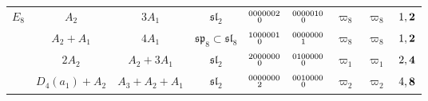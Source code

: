 \documentclass{amsart}
\theoremstyle{definition}
\newcommand{\0}{\mathcal{O}}
\begin{document}
\begin{table}[htp]
\begin{center}
\begin{tabular}{|c | c| c| c| c| c| c|c | c|}
				$E_8$ 
				& $A_2$ & $3A_1$ & $\mathfrak{sl}_2$ & $\scriptsize{\begin{aligned} 00 &00002 \\[-1.8mm] &0\end{aligned}}$ & $\scriptsize{\begin{aligned}00 &00010 \\[-1.8mm] &0\end{aligned}}$ 
                 & $\varpi_8$ & $\varpi_8$ 
                 & $1,{\bf 2}$\\

                & $A_2+A_1$ & $4A_1$ & $\mathfrak{sp}_8\subset \mathfrak{sl}_8$ & $\scriptsize{\begin{aligned}10 &00001 \\[-1.8mm] &0\end{aligned}}$ & $\scriptsize{\begin{aligned}00 &00000 \\[-1.8mm] &1\end{aligned}}$ 
                & $\varpi_8$ & $\varpi_8$ 
                & $\tiny{1, {\bf 2}}$ \\
                    
				& $2A_2$ & $A_2+3A_1$ & $\mathfrak{sl}_2$ & $\scriptsize{\begin{aligned}20 &00000 \\[-1.8mm] &0\end{aligned}}$ & $\scriptsize{\begin{aligned}01 &00000 \\[-1.8mm] &0\end{aligned}}$ 
                & $\varpi_1$	& $\varpi_1$ 
                & $2,{\bf 4}$ \\
				
				& $D_4(a_1)+A_2$ & $A_3{+}A_2{+}A_1$ & $\mathfrak{sl}_2$ & $\scriptsize{\begin{aligned}00 &00000 \\[-1.8mm] &2\end{aligned}}$ & $\scriptsize{\begin{aligned}00 &10000 \\[-1.8mm] &0\end{aligned}}$ 
                & $\varpi_2$ & $\varpi_2$ 
                & $4,{\bf 8}$ \\


\end{tabular}
\end{center}
\end{table}
\end{document}

